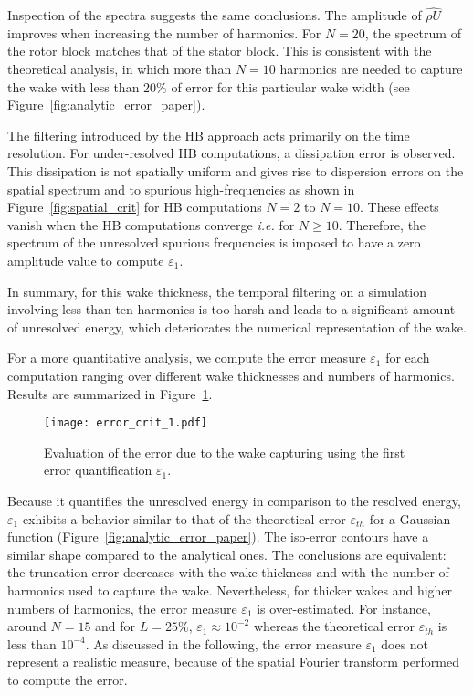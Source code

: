 Inspection of the spectra suggests the same conclusions.
The amplitude of $\widehat{\rho U}$ 
improves when increasing the number of harmonics.
For $N=20$, the spectrum of the rotor 
block matches that of the stator block.
This is consistent with the theoretical analysis, in which more than 
$N=10$ harmonics are needed to capture the wake with less than $20\%$ 
of error for this particular
wake width (see Figure~\ref{fig:analytic_error_paper}).

The filtering introduced by the HB approach 
acts primarily on the time resolution. 
For under-resolved HB computations, a dissipation error is observed.
This dissipation is not spatially uniform and gives rise to
dispersion errors on the spatial spectrum and to spurious
high-frequencies as shown in 
Figure~\ref{fig:spatial_crit} for HB computations $N=2$ to $N=10$.
These effects vanish when the HB computations converge
\emph{i.e.} for $N \geq 10$.
Therefore, the spectrum of the unresolved spurious frequencies 
is imposed to have a zero amplitude value to compute
$\varepsilon_1$.

In summary, for this wake thickness, the temporal filtering 
on a simulation involving less than ten harmonics is too harsh and leads 
to a significant amount of unresolved energy, 
which deteriorates the numerical representation
of the wake.

For a more quantitative analysis, we compute the error measure
$\varepsilon_1$ for each computation ranging over different 
wake thicknesses and numbers of harmonics. 
Results are summarized in Figure~\ref{fig:crit_1_3d}.
\begin{figure}[htp]
    \centering\texttt{[image: error\_crit\_1.pdf]}
  \caption{Evaluation of the error due to the wake 
  capturing using the first error quantification $\varepsilon_1$.}
  \label{fig:crit_1_3d}
\end{figure}
Because it quantifies the unresolved energy in 
comparison to the resolved energy, $\varepsilon_1$ 
exhibits a behavior similar to that of 
the theoretical error $\varepsilon_{th}$ for a Gaussian function 
(Figure~\ref{fig:analytic_error_paper}).
The iso-error contours have a similar shape 
compared to the analytical ones. 
The conclusions are equivalent: the truncation error decreases with 
the wake thickness and with the number of harmonics used to capture the wake.
Nevertheless, for thicker wakes and higher numbers of harmonics, 
the error measure $\varepsilon_1$ is over-estimated. 
For instance, around $N=15$ and for $L=25\%$,
$\varepsilon_1 \approx 10^{-2}$ whereas the theoretical error $\varepsilon_{th}$
is less than $10^{-4}$. As discussed in the following, the error 
measure $\varepsilon_1$ does not represent a 
realistic measure, because of the spatial 
Fourier transform performed to compute 
the error.


